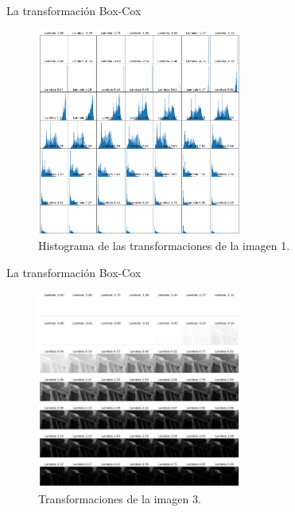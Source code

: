 \documentclass{beamer}
\begin{document}
\begin{frame}{La transformación Box-Cox}
    \begin{figure}
        \centering
        \includegraphics[width=0.6\textwidth]{all_lambda_hist_1.png}
        \caption{Histograma de las transformaciones de la imagen 1.}
        \label{fig:img_bci_hist_1}
    \end{figure}
\end{frame}



\begin{frame}{La transformación Box-Cox}
    \begin{figure}
        \centering
        \includegraphics[width=0.6\textwidth]{all_lambda_3.png}
        \caption{Transformaciones de la imagen 3.}
        \label{fig:all_lambda_2}
    \end{figure}
\end{frame}
\end{document}
